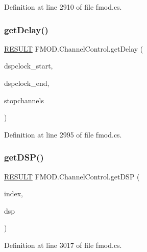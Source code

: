 Definition at line 2910 of file fmod.\+cs.

\mbox{\label{class_f_m_o_d_1_1_channel_control_a5749aed9842abbb5eacc05d8a5df4844}} 
\subsubsection{\texorpdfstring{get\+Delay()}{getDelay()}}
{\footnotesize\ttfamily \hyperlink{namespace_f_m_o_d_a305d1176ef3f8c8815861a60407ac33d}{R\+E\+S\+U\+LT} F\+M\+O\+D.\+Channel\+Control.\+get\+Delay (\begin{DoxyParamCaption}\item[{out ulong}]{dspclock\+\_\+start,  }\item[{out ulong}]{dspclock\+\_\+end,  }\item[{out bool}]{stopchannels }\end{DoxyParamCaption})}



Definition at line 2995 of file fmod.\+cs.

\mbox{\label{class_f_m_o_d_1_1_channel_control_ae082d636e279b1d67c4d434cd5ed6c40}} 
\subsubsection{\texorpdfstring{get\+D\+S\+P()}{getDSP()}}
{\footnotesize\ttfamily \hyperlink{namespace_f_m_o_d_a305d1176ef3f8c8815861a60407ac33d}{R\+E\+S\+U\+LT} F\+M\+O\+D.\+Channel\+Control.\+get\+D\+SP (\begin{DoxyParamCaption}\item[{int}]{index,  }\item[{out \hyperlink{class_f_m_o_d_1_1_d_s_p}{D\+SP}}]{dsp }\end{DoxyParamCaption})}



Definition at line 3017 of file fmod.\+cs.

\mbox{\label{class_f_m_o_d_1_1_channel_control_a8153e1f26fce11415d3f56bb6d20091b}} 
